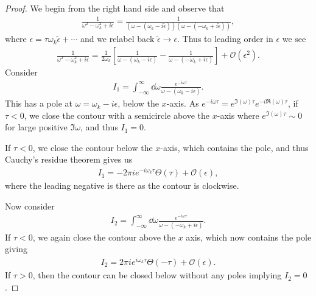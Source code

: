 \begin{proof}
    We begin from the right hand side and observe that
    \begin{align}
        \frac{1}{\omega^2 - \omega_k^2 + i \epsilon} = \frac{1}{\left( \omega - \left( \omega_k - i \widetilde{\epsilon} \right)  \right) \left( \omega - \left( - \omega_k + i\widetilde{\epsilon} \right)  \right) }
    ,\end{align}
    where $\epsilon = \tau \omega_k \widetilde{\epsilon} + \cdots$ and we relabel back $\widetilde{\epsilon} \to \epsilon$. Thus to leading order in $\epsilon$ we see
    \begin{align}
        \frac{1}{\omega^2 - \omega_k^2 + i \epsilon} = \frac{1}{2\omega_k} \left[ \frac{1}{\omega - \left( \omega_k - i \epsilon \right) } - \frac{1}{\omega - \left( - \omega_k + i \epsilon \right) } \right] +\mathcal{O}\left( \epsilon^2 \right) 
    .\end{align}
    Consider
    \begin{align}
        I_1 = \int_{-\infty}^{\infty} \dd{\omega} \frac{e^{-i \omega \tau}}{\omega - \left( \omega_k - i \epsilon \right) }
    .\end{align}
    This has a pole at $\omega = \omega_k - i \epsilon$, below the $x$-axis.
    As $e^{-i \omega \tau} = e^{\Im \left( \omega \right) \tau} e^{-i \Re \left( \omega \right) \tau}$, if $\tau < 0$, we close the contour with a semicircle above the $x$-axis where $e^{\Im \left( \omega \right) \tau} \sim 0$ for large positive $\Im \omega$, and thus $I_1 = 0$. 

    If $\tau < 0$, we close the contour below the $x$-axis, which contains the pole, and thus Cauchy's residue theorem gives us
    \begin{align}
        I_1 = -2\pi i e^{-i \omega_k \tau} \Theta \left( \tau \right) + \mathcal{O}\left( \epsilon \right) 
    ,\end{align}
    where the leading negative is there as the contour is clockwise.

    Now consider
    \begin{align}
        I_2 = \int_{-\infty}^{\infty} \dd{\omega} \frac{e^{-i \omega \tau}}{\omega - \left( - \omega_k + i \epsilon \right)}
    .\end{align}
    If $\tau < 0$, we again close the contour above the $x$ axis, which now contains the pole giving
    \begin{align}
        I_2 = 2\pi i e^{i \omega_k \tau} \Theta \left( -\tau \right) + \mathcal{O}\left( \epsilon \right) 
    .\end{align}
    If $\tau > 0$, then the contour can be closed below without any poles implying $I_2 = 0$.


\end{proof}
